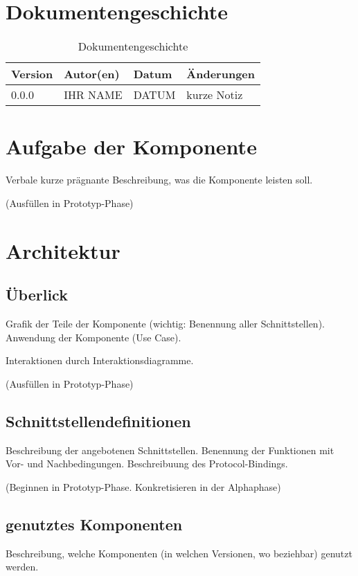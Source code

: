\section{Dokumentengeschichte}
\begin{table}[h]
 \begin{tabular}{|l|l|l|l|}
 \hline
 Version & Autor(en) & Datum & \"Anderungen \\
 \hline
 0.0.0 & IHR NAME & DATUM & kurze Notiz  \\
 \hline
 \end{tabular}
 \caption{Dokumentengeschichte}
 \end{table}

\section{Aufgabe der Komponente}
Verbale kurze pr\"agnante Beschreibung, was die Komponente leisten soll.

(Ausf\"ullen in Prototyp-Phase)

\section{Architektur}

\subsection{\"Uberlick}
Grafik der Teile der Komponente (wichtig: Benennung aller Schnittstellen).
Anwendung der Komponente (Use Case).

 Interaktionen durch Interaktionsdiagramme.

(Ausf\"ullen in Prototyp-Phase)

\subsection{Schnittstellendefinitionen}
Beschreibung der angebotenen Schnittstellen. Benennung der Funktionen
mit Vor- und Nachbedingungen. Beschreibuung des Protocol-Bindings.

(Beginnen in Prototyp-Phase. Konkretisieren in der Alphaphase)

\subsection{genutztes Komponenten}
Beschreibung, welche Komponenten (in welchen Versionen, wo beziehbar) genutzt werden.

